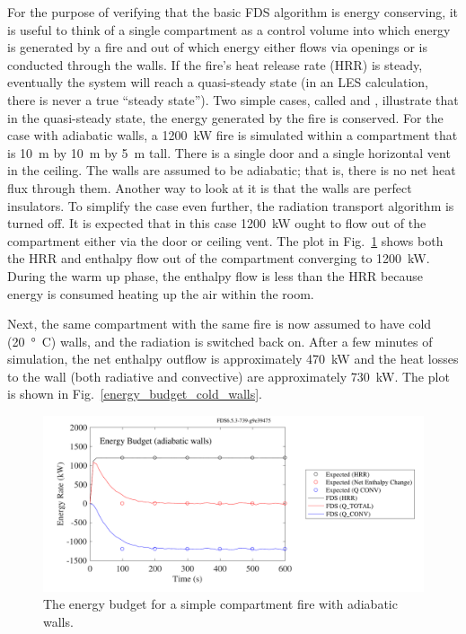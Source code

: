\documentclass[11pt]{book}
\begin{document}
For the purpose of verifying that the basic FDS algorithm is energy conserving, it is useful to think of a single compartment as a control volume into which energy is generated by a fire and out of which energy either flows via openings or is conducted through the walls. If the fire's heat release rate (HRR) is steady, eventually the system will reach a quasi-steady state (in an LES calculation, there is never a true ``steady state''). Two simple cases, called  and , illustrate that in the quasi-steady state, the energy generated by the fire is conserved. For the case with adiabatic walls, a 1200~kW fire is simulated within a compartment that is 10~m by 10~m by 5~m tall. There is a single door and a single horizontal vent in the ceiling. The walls are assumed to be adiabatic; that is, there is no net heat flux through them. Another way to look at it is that the walls are perfect insulators. To simplify the case even further, the radiation transport algorithm is turned off. It is expected that in this case 1200~kW ought to flow out of the compartment either via the
door or ceiling vent. The plot in Fig.~\ref{energy_budget_adiabatic_walls} shows both the HRR and enthalpy flow out of the compartment converging to 1200~kW. During the warm up phase, the enthalpy flow is less than the HRR because energy is consumed heating up the air within the room.

Next, the same compartment with the same fire is now assumed to have cold (20~\si{\degree C}) walls, and the radiation is switched back on. After a few minutes of simulation, the net enthalpy outflow is approximately 470~kW and the heat losses to the wall (both radiative and convective) are approximately 730~kW. The plot is shown in Fig.~\ref{energy_budget_cold_walls}.

\begin{figure}[ht]
\centering
\includegraphics[width=.9\textwidth]{SCRIPT_FIGURES/energy_budget_adiabatic_walls}
\caption[Energy Budget (adiabatic walls)]{The energy budget for a simple compartment fire with adiabatic walls.}
\label{energy_budget_adiabatic_walls}
\end{figure}
\end{document}
